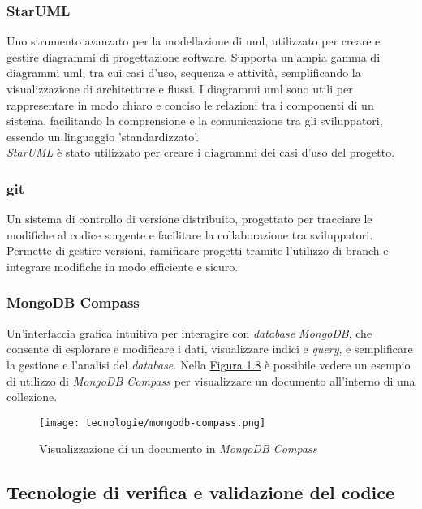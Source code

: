 \subsubsection{StarUML}

Uno strumento avanzato per la modellazione di \gls{uml}, utilizzato per creare e gestire diagrammi di progettazione software. Supporta un'ampia gamma di diagrammi \gls{uml}, tra cui casi d'uso, sequenza e attività, semplificando la visualizzazione di architetture e flussi.
I diagrammi \gls{uml} sono utili per rappresentare in modo chiaro e conciso le relazioni tra i componenti di un sistema, facilitando la comprensione e la comunicazione tra gli sviluppatori, essendo un linguaggio 'standardizzato'.\\
\textit{StarUML} è stato utilizzato per creare i diagrammi dei casi d’uso del progetto.

\pagebreak
\subsubsection{git}

Un sistema di controllo di versione distribuito, progettato per tracciare le modifiche al codice sorgente e facilitare la collaborazione tra sviluppatori. \\
Permette di gestire versioni, ramificare progetti tramite l'utilizzo di \gls{branch} e integrare modifiche in modo efficiente e sicuro. 

\subsubsection{MongoDB Compass}

Un'interfaccia grafica intuitiva per interagire con \textit{database MongoDB}, che consente di esplorare e modificare i dati, visualizzare indici e \textit{query},
e semplificare la gestione e l'analisi del \textit{database.}
Nella {\hyperref[fig:mongodb-compass]{Figura 1.8}} è possibile vedere un esempio di utilizzo di \textit{MongoDB Compass} per visualizzare un documento all'interno di una collezione.

\begin{figure}[H]
    \label{fig:mongodb-compass}
    \centering
    \texttt{[image: tecnologie/mongodb-compass.png]}
    \caption{Visualizzazione di un documento in \textit{MongoDB Compass}}
\end{figure}

\subsection{Tecnologie di verifica e validazione del codice}
\label{sez:tecnologie-validazione-codice}

